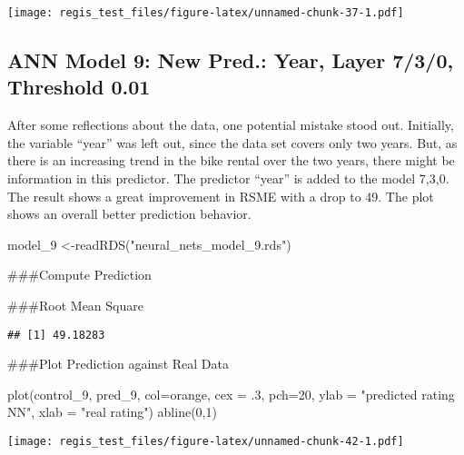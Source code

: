 \documentclass[
]{article}
\newenvironment{Shaded}{\begin{snugshade}}{\end{snugshade}}
\newcommand{\AttributeTok}[1]{\textcolor[rgb]{0.77,0.63,0.00}{#1}}
\newcommand{\DecValTok}[1]{\textcolor[rgb]{0.00,0.00,0.81}{#1}}
\newcommand{\FunctionTok}[1]{\textcolor[rgb]{0.00,0.00,0.00}{#1}}
\newcommand{\NormalTok}[1]{#1}
\newcommand{\OtherTok}[1]{\textcolor[rgb]{0.56,0.35,0.01}{#1}}
\newcommand{\StringTok}[1]{\textcolor[rgb]{0.31,0.60,0.02}{#1}}
\begin{document}
\texttt{[image: regis\_test\_files/figure-latex/unnamed-chunk-37-1.pdf]}

\hypertarget{ann-model-9-new-pred.-year-layer-730-threshold-0.01}{%
\subsection{ANN Model 9: New Pred.: Year, Layer 7/3/0, Threshold
0.01}\label{ann-model-9-new-pred.-year-layer-730-threshold-0.01}}

After some reflections about the data, one potential mistake stood out.
Initially, the variable ``year'' was left out, since the data set covers
only two years. But, as there is an increasing trend in the bike rental
over the two years, there might be information in this predictor. The
predictor ``year'' is added to the model 7,3,0. The result shows a great
improvement in RSME with a drop to 49. The plot shows an overall better
prediction behavior.

\begin{Shaded}
\begin{Highlighting}[]
\NormalTok{model\_9 }\OtherTok{\textless{}{-}}\FunctionTok{readRDS}\NormalTok{(}\StringTok{"neural\_nets\_model\_9.rds"}\NormalTok{)}
\end{Highlighting}
\end{Shaded}

\#\#\#Compute Prediction

\#\#\#Root Mean Square

\begin{verbatim}
## [1] 49.18283
\end{verbatim}

\#\#\#Plot Prediction against Real Data

\begin{Shaded}
\begin{Highlighting}[]
\FunctionTok{plot}\NormalTok{(control\_9, pred\_9, }\AttributeTok{col=}\StringTok{\textquotesingle{}orange\textquotesingle{}}\NormalTok{, }\AttributeTok{cex =}\NormalTok{ .}\DecValTok{3}\NormalTok{, }\AttributeTok{pch=}\DecValTok{20}\NormalTok{, }\AttributeTok{ylab =} \StringTok{"predicted rating NN"}\NormalTok{, }\AttributeTok{xlab =} \StringTok{"real rating"}\NormalTok{)}
\FunctionTok{abline}\NormalTok{(}\DecValTok{0}\NormalTok{,}\DecValTok{1}\NormalTok{)}
\end{Highlighting}
\end{Shaded}

\texttt{[image: regis\_test\_files/figure-latex/unnamed-chunk-42-1.pdf]}
\end{document}
